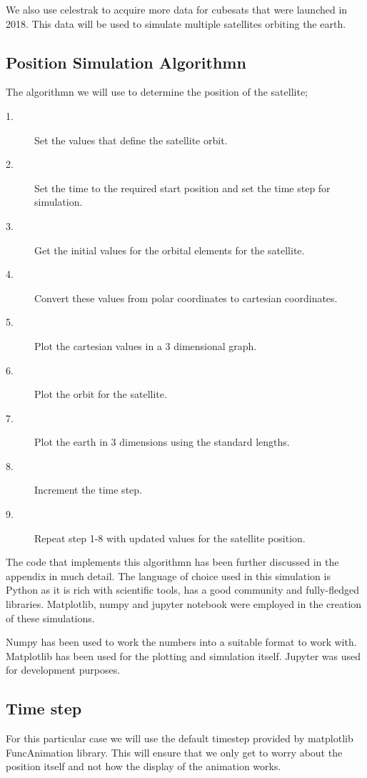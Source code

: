 We also use celestrak to acquire more data for cubesats that were launched in 2018. This data will be used to simulate multiple satellites orbiting the earth.

\subsection{Position Simulation Algorithmn}
The algorithmn we will use to determine the position of the satellite;\\
\begin{description}
	\item[1.] Set the values that define the satellite orbit.
	\item[2.] Set the time to the required start position and set the time step for simulation.
	\item[3.] Get the initial values for the orbital elements for the satellite.
	\item[4.] Convert these values from polar coordinates to cartesian coordinates.
	\item[5.] Plot the cartesian values in a 3 dimensional graph.
	\item[6.] Plot the orbit for the satellite.
	\item[7.] Plot the earth in 3 dimensions using the standard lengths.
	\item[8.] Increment the time step.
	\item[9.] Repeat step 1-8 with updated values for the satellite position.
\end{description}

The code that implements this algorithmn has been further discussed in the appendix in much detail. The language of choice used in this simulation is Python as it is rich with scientific tools, has a good community and fully-fledged libraries. Matplotlib, numpy and jupyter notebook were employed in the creation of these simulations.

Numpy has been used to work the numbers into a suitable format to work with. Matplotlib has been used for the plotting and simulation itself. Jupyter was used for development purposes.
\subsection{Time step}
For this particular case we will use the default timestep provided by matplotlib FuncAnimation library. This will ensure that we only get to worry about the position itself and not how the display of the animation works.
\\
\\
\\
